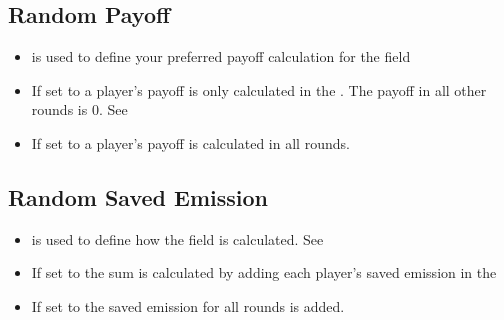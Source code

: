 \documentclass[letterpaper,10pt,english]{sphinxmanual}
\begin{document}
\subsection{Random Payoff}
\label{\detokenize{Constants:random-payoff}}\label{\detokenize{Constants:id2}}\begin{itemize}
\item {} 
 is used to define your preferred payoff calculation for the  field

\item {} 
If set to  a player’s payoff is only calculated in the . The payoff in all other rounds is 0. See {\hyperref[\detokenize{Subsession_fields:paying-round-ref}]{}}

\item {} 
If set to  a player’s payoff is calculated in all rounds.

\end{itemize}


\subsection{Random Saved Emission}
\label{\detokenize{Constants:random-saved-emission}}\label{\detokenize{Constants:random-emission}}\begin{itemize}
\item {} 
 is used to define how the  field is calculated. See {\hyperref[\detokenize{Subsession_fields:sum-saved-emission-ref}]{}}

\item {} 
If set to  the sum is calculated by adding each player’s saved emission in the 

\item {} 
If set to  the saved emission for all rounds is added.

\end{itemize}
\end{document}
